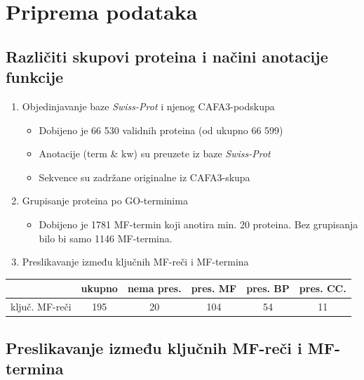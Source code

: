 \documentclass{beamer}
\newcommand{\swissprot}{\textit{Swiss-Prot} }
\begin{document}
\section{Priprema podataka}
\subsection{Različiti skupovi proteina i načini anotacije funkcije}
\begin{frame}

  \pause
  \begin{enumerate}
    \item Objedinjavanje baze \swissprot i njenog CAFA3-podskupa
      \pause
      \begin{itemize}
        \item Dobijeno je 66 530 validnih proteina (od ukupno 66 599)
        \item Anotacije (term \& kw) su preuzete iz baze \swissprot
        \item Sekvence su zadržane originalne iz CAFA3-skupa
      \end{itemize}
      \pause
    \item Grupisanje proteina po GO-terminima
      \pause
      \begin{itemize}
        \item Dobijeno je 1781 MF-termin koji anotira min. 20 proteina.
              Bez grupisanja bilo bi samo 1146 MF-termina.
      \end{itemize}
      \pause
    \item Preslikavanje između ključnih MF-reči i MF-termina
      \pause


  \end{enumerate}

  \begin{table}
    \begin{tabular}{|r|c|c|c|c|c|}
      \hline
      & ukupno & nema pres. & pres. MF & pres. BP & pres. CC.      \\
      \hline
      ključ. MF-reči  & 195    &  20       &  104     & 54      & 11           \\
      \hline
    \end{tabular}
  \end{table}
  
\end{frame}

\subsection{Preslikavanje između ključnih MF-reči i MF-termina}
\end{document}
